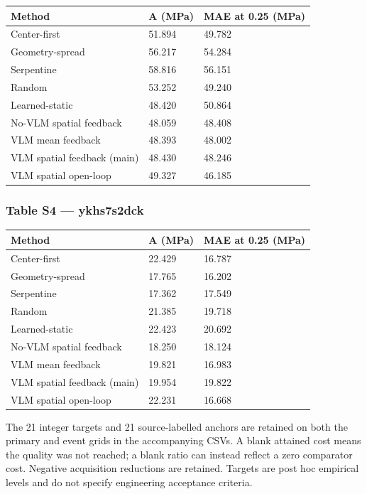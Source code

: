 \documentclass[11pt,a4paper]{article}
\begin{document}
{ %
\begin{longtable}[]{@{}lll@{}}
\toprule\noalign{}
Method & A (MPa) & MAE at 0.25 (MPa) \\
\midrule\noalign{}
\endhead
\bottomrule\noalign{}
\endlastfoot
Center-first & 51.894 & 49.782 \\
Geometry-spread & 56.217 & 54.284 \\
Serpentine & 58.816 & 56.151 \\
Random & 53.252 & 49.240 \\
Learned-static & 48.420 & 50.864 \\
No-VLM spatial feedback & 48.059 & 48.408 \\
VLM mean feedback & 48.393 & 48.002 \\
VLM spatial feedback (main) & 48.430 & 48.246 \\
VLM spatial open-loop & 49.327 & 46.185 \\
\end{longtable}
}

\subsubsection{Table S4 --- ykhs7s2dck}\label{table-s4-ykhs7s2dck}

{ %
\begin{longtable}[]{@{}lll@{}}
\toprule\noalign{}
Method & A (MPa) & MAE at 0.25 (MPa) \\
\midrule\noalign{}
\endhead
\bottomrule\noalign{}
\endlastfoot
Center-first & 22.429 & 16.787 \\
Geometry-spread & 17.765 & 16.202 \\
Serpentine & 17.362 & 17.549 \\
Random & 21.385 & 19.718 \\
Learned-static & 22.423 & 20.692 \\
No-VLM spatial feedback & 18.250 & 18.124 \\
VLM mean feedback & 19.821 & 16.983 \\
VLM spatial feedback (main) & 19.954 & 19.822 \\
VLM spatial open-loop & 22.231 & 16.668 \\
\end{longtable}
}

The 21 integer targets and 21 source-labelled anchors are retained on both the primary and event grids in the accompanying CSVs. A blank attained cost means the quality was not reached; a blank ratio can instead reflect a zero comparator cost. Negative acquisition reductions are retained. Targets are post hoc empirical levels and do not specify engineering acceptance criteria.
\end{document}
